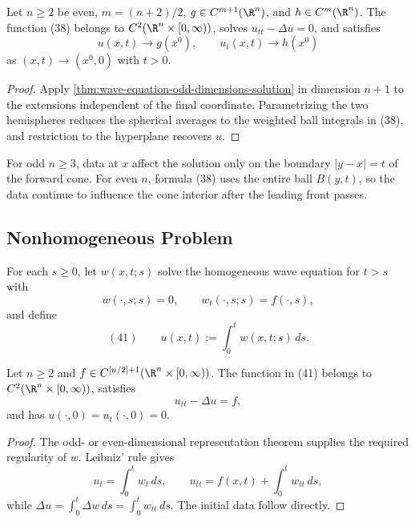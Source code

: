 \begin{theorem}
\label{thm:wave-equation-even-dimensions-solution}
Let $n\ge2$ be even, $m=(n+2)/2$, $g\in C^{m+1}(\R^n)$, and
$h\in C^m(\R^n)$. The function (38) belongs to
$C^2(\R^n\times[0,\infty))$, solves $u_{tt}-\Delta u=0$, and satisfies
$$u(x,t)\to g(x^0),
\qquad
u_t(x,t)\to h(x^0)$$
as $(x,t)\to(x^0,0)$ with $t>0$.
\end{theorem}
\begin{proof}
\sketch Apply \cref{thm:wave-equation-odd-dimensions-solution} in dimension
$n+1$ to the extensions independent of the final coordinate. Parametrizing
the two hemispheres reduces the spherical averages to the weighted ball
integrals in (38), and restriction to the hyperplane recovers $u$.
\end{proof}

\begin{remark}
\label{rem:huygens-principle}
For odd $n\ge3$, data at $x$ affect the solution only on the boundary
$|y-x|=t$ of the forward cone. For even $n$, formula (38) uses the entire ball
$B(y,t)$, so the data continue to influence the cone interior after the
leading front passes.
\end{remark}

\subsection{Nonhomogeneous Problem}
\label{sec:wave-nonhomogeneous-problem}

For each $s\ge0$, let $w(x,t;s)$ solve the homogeneous wave equation for
$t>s$ with
$$w(\cdot,s;s)=0,
\qquad
w_t(\cdot,s;s)=f(\cdot,s),$$
and define
$$(41)\qquad u(x,t):=\int_0^t w(x,t;s)\,ds.$$

\begin{theorem}
\label{thm:wave-equation-nonhomogeneous-duhamel}
Let $n\ge2$ and $f\in C^{[n/2]+1}(\R^n\times[0,\infty))$. The function
in (41) belongs to $C^2(\R^n\times[0,\infty))$, satisfies
$$u_{tt}-\Delta u=f,$$
and has $u(\cdot,0)=u_t(\cdot,0)=0$.
\end{theorem}
\begin{proof}
\sketch The odd- or even-dimensional representation theorem supplies the
required regularity of $w$. Leibniz' rule gives
$$u_t=\int_0^t w_t\,ds,
\qquad
u_{tt}=f(x,t)+\int_0^t w_{tt}\,ds,$$
while $\Delta u=\int_0^t\Delta w\,ds=\int_0^t w_{tt}\,ds$. The initial data
follow directly.
\end{proof}

